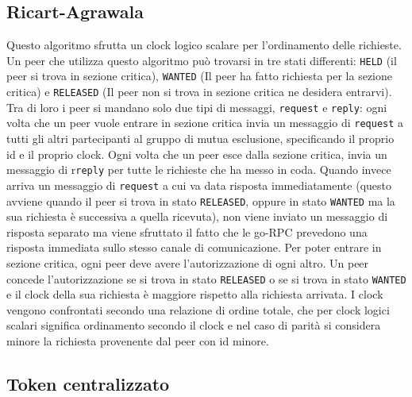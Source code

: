 \documentclass[conference]{IEEEtran}
\begin{document}
\subsection{Ricart-Agrawala}

Questo algoritmo sfrutta un clock logico scalare per l'ordinamento delle richieste. Un peer che utilizza questo algoritmo può trovarsi in tre stati differenti: 
\verb|HELD| (il peer si trova in sezione critica), \verb|WANTED| (Il peer ha fatto richiesta per la sezione critica) e \verb|RELEASED| (Il peer non si trova in sezione critica ne desidera entrarvi).
Tra di loro i peer si mandano solo due tipi di messaggi, \verb|request| e \verb|reply|: ogni volta che un peer vuole entrare in sezione critica invia un messaggio di \verb|request| a tutti gli altri partecipanti al gruppo di mutua esclusione, specificando il proprio id e il proprio clock. Ogni volta che un peer esce dalla sezione critica, invia un messaggio di r\verb|reply| per tutte le richieste che ha messo in coda. Quando invece arriva un messaggio di \verb|request| a cui va data risposta immediatamente (questo avviene quando il peer si trova in stato \verb|RELEASED|, oppure in stato \verb|WANTED| ma la sua richiesta è successiva a quella ricevuta), non viene inviato un messaggio di risposta separato ma viene sfruttato il fatto che le go-RPC prevedono una risposta immediata sullo stesso canale di comunicazione. Per poter entrare in sezione critica, ogni peer deve avere l'autorizzazione di ogni altro. Un peer concede l'autorizzazione se si trova in stato \verb|RELEASED| o se si trova in stato \verb|WANTED| e il clock della sua richiesta è maggiore rispetto alla richiesta arrivata. I clock vengono confrontati secondo una relazione di ordine totale,  che per clock logici scalari significa ordinamento secondo il clock e nel caso di parità si considera minore la richiesta provenente dal peer con id minore.

\subsection{Token centralizzato}
\end{document}
